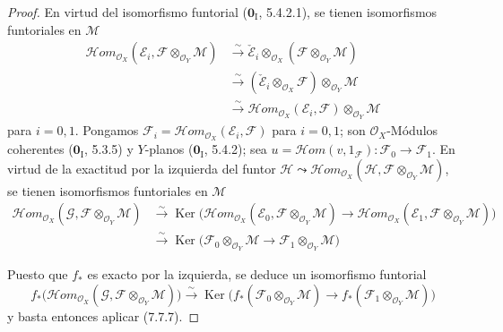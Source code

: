 \begin{proof}
En virtud del isomorfismo funtorial ($\mathbf{0}_{\mathrm I}$, 5.4.2.1), se tienen
isomorfismos funtoriales en $\mathscr M$
\begin{align*}
  \mathscr{H}\!om_{\mathscr O_X}
    (\mathscr E_i,\mathscr F\otimes_{\mathscr O_Y}\mathscr M)
  &\xrightarrow{\sim}
  \check{\mathscr E}_i
    \otimes_{\mathscr O_X}
    (\mathscr F\otimes_{\mathscr O_Y}\mathscr M)\\
  &\xrightarrow{\sim}
  (\check{\mathscr E}_i\otimes_{\mathscr O_X}\mathscr F)
    \otimes_{\mathscr O_Y}\mathscr M\\
  &\xrightarrow{\sim}
  \mathscr{H}\!om_{\mathscr O_X}(\mathscr E_i,\mathscr F)
    \otimes_{\mathscr O_Y}\mathscr M
\end{align*}
para $i=0,1$. Pongamos
$\mathscr F_i=\mathscr{H}\!om_{\mathscr O_X}(\mathscr E_i,\mathscr F)$ para
$i=0,1$; son $\mathscr O_X$-Módulos coherentes ($\mathbf{0}_{\mathrm I}$, 5.3.5)
y $Y$-planos ($\mathbf{0}_{\mathrm I}$, 5.4.2); sea
$u=\mathscr{H}\!om(v,1_{\mathscr F}):\mathscr F_0\to\mathscr F_1$. En virtud de
la exactitud por la izquierda del funtor
$\mathscr H\leadsto\mathscr{H}\!om_{\mathscr O_X}
(\mathscr H,\mathscr F\otimes_{\mathscr O_Y}\mathscr M)$, se tienen isomorfismos
funtoriales en $\mathscr M$
\begin{align*}
  \mathscr{H}\!om_{\mathscr O_X}
    (\mathscr G,\mathscr F\otimes_{\mathscr O_Y}\mathscr M)
  &\xrightarrow{\sim}
  \operatorname{Ker}
  \bigl(
    \mathscr{H}\!om_{\mathscr O_X}
      (\mathscr E_0,\mathscr F\otimes_{\mathscr O_Y}\mathscr M)
    \longrightarrow
    \mathscr{H}\!om_{\mathscr O_X}
      (\mathscr E_1,\mathscr F\otimes_{\mathscr O_Y}\mathscr M)
  \bigr)\\
  &\xrightarrow{\sim}
  \operatorname{Ker}
  \bigl(
    \mathscr F_0\otimes_{\mathscr O_Y}\mathscr M
    \longrightarrow
    \mathscr F_1\otimes_{\mathscr O_Y}\mathscr M
  \bigr)
\end{align*}

Puesto que $f_*$ es exacto por la izquierda, se deduce un isomorfismo funtorial
\[
  f_*
  \bigl(
    \mathscr{H}\!om_{\mathscr O_X}
      (\mathscr G,\mathscr F\otimes_{\mathscr O_Y}\mathscr M)
  \bigr)
  \xrightarrow{\sim}
  \operatorname{Ker}
  \bigl(
    f_*(\mathscr F_0\otimes_{\mathscr O_Y}\mathscr M)
    \longrightarrow
    f_*(\mathscr F_1\otimes_{\mathscr O_Y}\mathscr M)
  \bigr)
\]
y basta entonces aplicar (7.7.7).
\end{proof}



